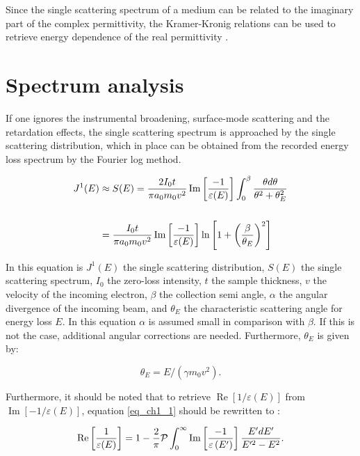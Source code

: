 \documentclass[12pt,a4paper]{article}
\def\frac#1#2{{{#1}\over {#2}}}
\numberwithin{equation}{section}
\numberwithin{figure}{section}
\numberwithin{table}{section}
\begin{document}
Since the single scattering spectrum of a medium can be related to the imaginary part of the complex permittivity, the Kramer-Kronig relations can be used to retrieve energy dependence of the real permittivity \cite{egerton_2011}. 




\section{Spectrum analysis}
If one ignores the instrumental broadening, surface-mode scattering and the retardation effects, the single scattering spectrum is approached by the single scattering distribution, which in place can be obtained from the recorded energy loss spectrum by the Fourier log method. \cite{egerton_2011}

\begin{equation}\label{eq_S_E}
\begin{aligned}
J^{1}(E) & \approx S(E)=\frac{2 I_{0} t}{\pi a_{0} m_{0} v^{2}} \operatorname{Im}\left[\frac{-1}{\varepsilon(E)}\right] \int_{0}^{\beta} \frac{\theta d \theta}{\theta^{2}+\theta_{E}^{2}} \\
\\
&=\frac{I_{0} t}{\pi a_{0} m_{0} v^{2}} \operatorname{Im}\left[\frac{-1}{\varepsilon(E)}\right] \ln \left[1+\left(\frac{\beta}{\theta_{E}}\right)^{2}\right]
\end{aligned}
\end{equation}

In this equation is $J^1(E)$ the single scattering distribution, $S(E)$ the single scattering spectrum, $I_0$ the zero-loss intensity, $t$ the sample thickness, $v$ the velocity of the incoming electron, $\beta$ the collection semi angle, $\alpha$ the angular divergence of the incoming beam, and $\theta_E$ the characteristic scattering angle for energy loss $E$. In this equation $\alpha$ is assumed small in comparison with $\beta$. If this is not the case, additional angular corrections are needed. Furthermore, $\theta_E$ is given by:

\begin{equation} \label{eq_th_E}
    \theta_E = E/(\gamma m_0v^2) .
\end{equation}


Furthermore, it should be noted that to retrieve $\operatorname{Re}\left[1/\varepsilon(E)\right]$ from $\operatorname{Im}\left[-1/\varepsilon(E)\right]$, equation \eqref{eq_ch1_1} should be rewritten to \cite{Dapor2017}:

\begin{equation}\label{eq_kkr_eps}
    \operatorname{Re}\left[\frac{1}{\varepsilon(E)}\right]=1-\frac{2}{\pi} \mathcal{P} \int_{0}^{\infty} \operatorname{Im}\left[\frac{-1}{\varepsilon\left(E^{\prime}\right)}\right] \frac{E^{\prime} d E^{\prime}}{E^{\prime 2}-E^{2}}.
\end{equation}
\end{document}
